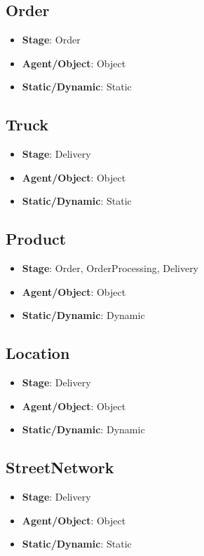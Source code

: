 \documentclass[12pt]{article}
\begin{document}
\newpage{}
\subsection{Order}%
\label{sub:order}
\begin{itemize}
    \item \textbf{Stage}: Order
    \item \textbf{Agent/Object}: Object
    \item \textbf{Static/Dynamic}: Static
\end{itemize}

\subsection{Truck}%
\label{sub:truck}
\begin{itemize}
    \item \textbf{Stage}: Delivery
    \item \textbf{Agent/Object}: Object
    \item \textbf{Static/Dynamic}: Static
\end{itemize}

\subsection{Product}%
\label{sub:product}
\begin{itemize}
    \item \textbf{Stage}: Order, OrderProcessing, Delivery
    \item \textbf{Agent/Object}: Object
    \item \textbf{Static/Dynamic}: Dynamic
\end{itemize}

\subsection{Location}%
\label{sub:location}
\begin{itemize}
    \item \textbf{Stage}: Delivery
    \item \textbf{Agent/Object}: Object
    \item \textbf{Static/Dynamic}: Dynamic
\end{itemize}

\subsection{StreetNetwork}%
\label{sub:street_network}
\begin{itemize}
    \item \textbf{Stage}: Delivery
    \item \textbf{Agent/Object}: Object
    \item \textbf{Static/Dynamic}: Static
\end{itemize}
\end{document}
